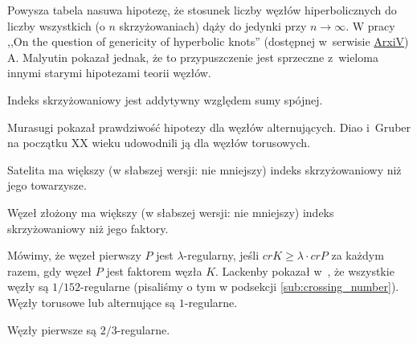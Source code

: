 Powysza tabela nasuwa hipotezę,
że stosunek liczby węzłów hiperbolicznych do liczby wszystkich
(o $n$ skrzyżowaniach) dąży do jedynki przy $n \to \infty$.
W pracy ,,On the question of genericity of hyperbolic knots'' (dostępnej w~serwisie \href{https://arxiv.org/abs/1612.03368v1}{ArxiV}) A. Malyutin pokazał jednak, że to przypuszczenie jest sprzeczne z~wieloma innymi starymi hipotezami teorii węzłów.

\begin{conjecture}
    Indeks skrzyżowaniowy jest addytywny względem sumy spójnej.
\end{conjecture}

Murasugi pokazał prawdziwość hipotezy dla węzłów alternujących.
Diao i~Gruber na początku XX wieku udowodnili ją dla węzłów torusowych.

\begin{conjecture}
    Satelita ma większy
    (w słabszej wersji: nie mniejszy)
    indeks skrzyżowaniowy niż jego towarzysze.
\end{conjecture}

\begin{conjecture}
    Węzeł złożony ma większy
    (w słabszej wersji: nie mniejszy)
    indeks skrzyżowaniowy niż jego faktory.
\end{conjecture}

Mówimy, że węzeł pierwszy $P$ jest $\lambda$-regularny,
jeśli $cr K \ge \lambda \cdot cr P$ za każdym razem,
gdy węzeł $P$ jest faktorem węzła $K$.
Lackenby pokazał w~\cite{lackenby09}, że wszystkie węzły są $1/152$-regularne (pisaliśmy o tym w podsekcji \ref{sub:crossing_number}).
Węzły torusowe lub alternujące są $1$-regularne.

\begin{conjecture}
    Węzły pierwsze są $2/3$-regularne.
\end{conjecture}





